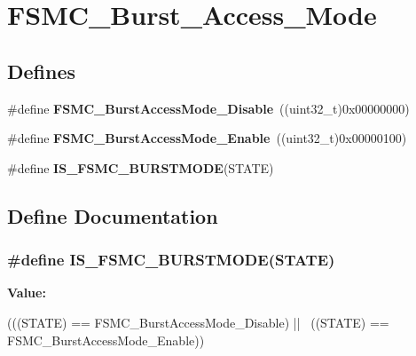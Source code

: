 \hypertarget{group__FSMC__Burst__Access__Mode}{
\section{FSMC\_\-Burst\_\-Access\_\-Mode}
\label{group__FSMC__Burst__Access__Mode}
}
\subsection*{Defines}
\begin{DoxyCompactItemize}
\item 
\hypertarget{group__FSMC__Burst__Access__Mode_ga26fc544945415e350563a9b00684850c}{
\#define {\bfseries FSMC\_\-BurstAccessMode\_\-Disable}~((uint32\_\-t)0x00000000)}
\label{group__FSMC__Burst__Access__Mode_ga26fc544945415e350563a9b00684850c}

\item 
\hypertarget{group__FSMC__Burst__Access__Mode_ga841831dfacfdd8889dafe26cc594bf02}{
\#define {\bfseries FSMC\_\-BurstAccessMode\_\-Enable}~((uint32\_\-t)0x00000100)}
\label{group__FSMC__Burst__Access__Mode_ga841831dfacfdd8889dafe26cc594bf02}

\item 
\#define {\bfseries IS\_\-FSMC\_\-BURSTMODE}(STATE)
\end{DoxyCompactItemize}


\subsection{Define Documentation}
\hypertarget{group__FSMC__Burst__Access__Mode_gaf8736659c5064c3c03753d7874401e71}{
\subsubsection[{IS\_\-FSMC\_\-BURSTMODE}]{\setlength{\rightskip}{0pt plus 5cm}\#define IS\_\-FSMC\_\-BURSTMODE(STATE)}}
\label{group__FSMC__Burst__Access__Mode_gaf8736659c5064c3c03753d7874401e71}
{\bfseries Value:}
\begin{DoxyCode}
(((STATE) == FSMC_BurstAccessMode_Disable) || \
                                  ((STATE) == FSMC_BurstAccessMode_Enable))
\end{DoxyCode}
